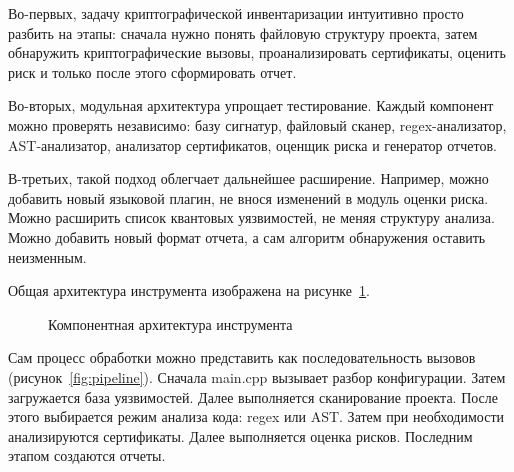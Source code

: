 \documentclass{itmo-vkr}
\begin{document}
	Во-первых, задачу криптографической инвентаризации интуитивно просто разбить на этапы: сначала нужно понять файловую структуру проекта, затем обнаружить криптографические вызовы, проанализировать сертификаты, оценить риск и только после этого сформировать отчет.
	
	Во-вторых, модульная архитектура упрощает тестирование. Каждый компонент можно проверять независимо: базу сигнатур, файловый сканер, regex-анализатор, AST-анализатор, анализатор сертификатов, оценщик риска и генератор отчетов.
	
	В-третьих, такой подход облегчает дальнейшее расширение. Например, можно добавить новый языковой плагин, не внося изменений в модуль оценки риска. Можно расширить список квантовых уязвимостей, не меняя структуру анализа. Можно добавить новый формат отчета, а сам алгоритм обнаружения оставить неизменным.
	
	Общая архитектура инструмента изображена на рисунке~\ref{fig:structure}.

\begin{figure}[ht]
\centering
{}
\caption{Компонентная архитектура инструмента}
\label{fig:structure}
\end{figure}

	Сам процесс обработки можно представить как последовательность вызовов (рисунок~\ref{fig:pipeline}). Сначала main.cpp вызывает разбор конфигурации. Затем загружается база уязвимостей. Далее выполняется сканирование проекта. После этого выбирается режим анализа кода: regex или AST. Затем при необходимости анализируются сертификаты. Далее выполняется оценка рисков. Последним этапом создаются отчеты.
\end{document}
